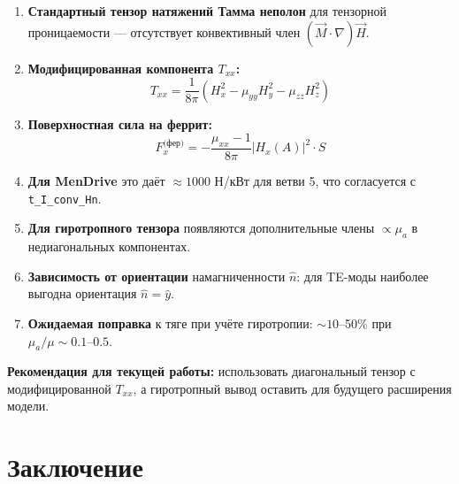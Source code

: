 \documentclass[a4paper,12pt]{article}
\begin{document}
\begin{enumerate}
    \item \textbf{Стандартный тензор натяжений Тамма неполон} для тензорной проницаемости --- отсутствует конвективный член $(\vec{M}\cdot\nabla)\vec{H}$.

    \item \textbf{Модифицированная компонента $T_{xx}$:}
    \begin{equation}
    T_{xx} = \frac{1}{8\pi}\left(H_x^2 - \mu_{yy}H_y^2 - \mu_{zz}H_z^2\right)
    \label{eq:txx_final}
    \end{equation}

    \item \textbf{Поверхностная сила на феррит:}
    \begin{equation}
    F_x^{\text{(фер)}} = -\frac{\mu_{xx}-1}{8\pi}|H_x(A)|^2 \cdot S
    \label{eq:fx_ferrite_final}
    \end{equation}

    \item \textbf{Для MenDrive} это даёт $\approx 1000$ Н/кВт для ветви 5, что согласуется с \texttt{t\_I\_conv\_Hn}.

    \item \textbf{Для гиротропного тензора} появляются дополнительные члены $\propto \mu_a$ в недиагональных компонентах.

    \item \textbf{Зависимость от ориентации} намагниченности $\hat{n}$: для TE-моды наиболее выгодна ориентация $\hat{n} = \hat{y}$.

    \item \textbf{Ожидаемая поправка} к тяге при учёте гиротропии: $\sim 10$--50\% при $\mu_a/\mu \sim 0.1$--$0.5$.
\end{enumerate}

\textbf{Рекомендация для текущей работы:} использовать диагональный тензор с модифицированной $T_{xx}$, а гиротропный вывод оставить для будущего расширения модели.











\section{Заключение}
\end{document}
